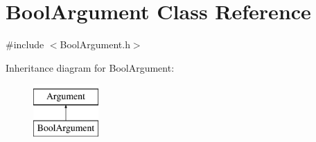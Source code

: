 \hypertarget{classBoolArgument}{\section{Bool\-Argument Class Reference}
\label{classBoolArgument}
}


{\ttfamily \#include $<$Bool\-Argument.\-h$>$}

Inheritance diagram for Bool\-Argument\-:\begin{figure}[H]
\begin{center}
\leavevmode
\includegraphics[height=2.000000cm]{classBoolArgument}
\end{center}
\end{figure}

